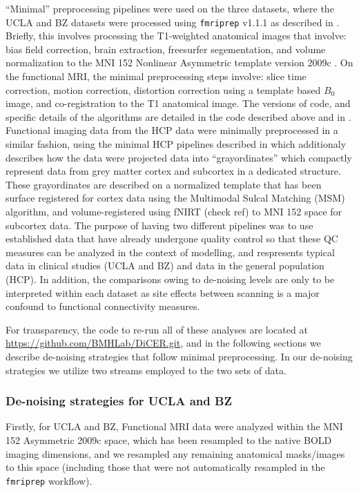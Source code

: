 \documentclass[oneside]{zHenriquesLab-StyleBioRxiv}
\begin{document}
``Minimal'' preprocessing pipelines were used on the three datasets, where the UCLA and BZ datasets were processed using \verb|fmriprep| v1.1.1 as described in \cite{aquino2019identifying}. Briefly, this involves processing the T1-weighted anatomical images that involve: bias field correction, brain extraction, freesurfer segementation, and volume normalization to the MNI 152 Nonlinear Asymmetric template version 2009c \cite{mni}. On the functional MRI, the minimal preprocessing steps involve: slice time correction, motion correction, distortion correction using a template based $B_0$ image, and co-registration to the T1 anatomical image. The versions of code, and specific details of the algorithms are detailed in the code described above and in \cite{aquino2019identifying}. Functional imaging data from the HCP data were minimally preprocessed in a similar fashion, using the minimal HCP pipelines described in \citet{hcppipelines} which additionaly describes how the data were projected data into ``grayordinates'' which compactly represent data from grey matter cortex and subcortex in a dedicated structure. These grayordinates are described on a normalized template that has been surface registered for cortex data using the Multimodal Sulcal Matching (MSM) algorithm, and volume-registered using fNIRT \cite{mcflirt} (check ref) to MNI 152 space for subcortex data. The purpose of having two different pipelines was to use established data that have already undergone quality control so that these QC measures can be analyzed in the context of modelling, and respresents typical data in clinical studies (UCLA and BZ) and data in the general population (HCP). In addition, the comparisons owing to de-noising levels are only to be interpreted within each dataset as site effects between scanning is a major confound to functional connectivity measures. 

For transparency, the code to re-run all of these analyses are located at \vbox{\url{https://github.com/BMHLab/DiCER.git}}, and in the following sections we describe de-noising strategies that follow minimal preprocessing. In our de-noising strategies we utilize two streams employed to the two sets of data. 

\subsubsection*{De-noising strategies for UCLA and BZ} 

Firstly, for UCLA and BZ, Functional MRI data were analyzed within the MNI 152 Asymmetric 2009c space, which has been resampled to the native BOLD imaging dimensions, and we resampled any remaining anatomical masks/images to this space (including those that were not automatically resampled in the \verb|fmriprep| workflow). 
\end{document}
